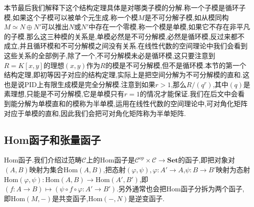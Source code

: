 本节最后我们解释下这个结构定理具体是对哪类子模的分解.称一个子模是循环子模,如果这个子模可以被单个元生成.称一个模$M$是不可分解子模,如从模同构$M\simeq N\oplus N'$可以推出$N$或$N'$中存在一个零模.称一个模是单模,如果它不存在非平凡的子模.那么这三种模的关系是,单模必然是不可分解模,必然是循环模,反过来都不成立,并且循环模和不可分解模之间没有关系.在线性代数的空间理论中我们会看到这些关系的全部例子,除了一个,不可分解模未必是循环模,这只要注意到$R=K[x,y]$的理想$(x,y)$作为$R$的模是不可分解模,但不是循环模.本节的第一个结构定理,即初等因子对应的结构定理,实际上是把空间分解为不可分解模的直和.这也是说PID上有限生成模是完全分解模.注意到如果$r>1$,那么$R/(q^r)$,其中$(q)$是素理想,只能是不可分解模,它是单模只有$r=1$的情况才能保证.我们在后文中会看到能分解为单模直和的模称为半单模,运用在线性代数的空间理论中,可对角化矩阵对应于单模的直和,因此我们会把可对角化矩阵称为半单矩阵.
\newpage
\subsection{Hom函子和张量函子}

Hom函子.我们介绍过范畴$\mathscr{C}$上的Hom函子是$\mathscr{C}^{op}\times\mathscr{C}\to\textbf{Set}$的函子,即把对象对$(A,B)$映射为集合$\mathrm{Hom}(A,B)$,把态射$(\varphi,\psi),\varphi:A'\to A$,$\psi:B\to B'$映射为态射$\mathrm{Hom}(\varphi,\psi):\mathrm{Hom}(A,B)\to\mathrm{Hom}(A',B')$,即$(f:A\to B)\mapsto(\psi\circ f\circ\varphi:A'\to B')$.另外通常也会把Hom函子分拆为两个函子,即$\mathrm{Hom}(M,-)$是共变函子,$\mathrm{Hom}(-,N)$是逆变函子.

